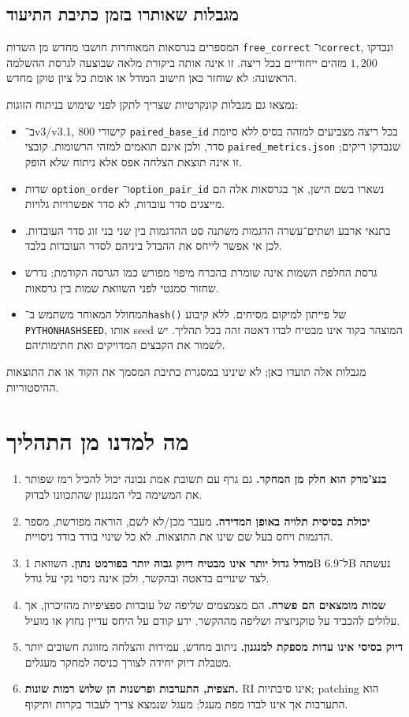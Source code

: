 \documentclass[11pt,a4paper]{article}
\newcommand{\en}[1]{\textenglish{#1}}
\newcommand{\file}[1]{\textenglish{\nolinkurl{#1}}}
\begin{document}
\subsection{מגבלות שאותרו בזמן כתיבת התיעוד}
המספרים בגרסאות המאוחרות חושבו מחדש מן השדות \file{free_correct} ו־\file{correct}, ונבדקו $1{,}200$ מזהים ייחודיים בכל ריצה. זו אינה אותה ביקורת מלאה שבוצעה לגרסת ההשלמה הראשונה: לא שוחזר כאן חישוב המודל או אומת כל ציון טוקן מחדש.

נמצאו גם מגבלות קונקרטיות שצריך לתקן לפני שימוש בניתוח הזוגות:
\begin{itemize}
\item ב־\en{v3/v3.1}, $800$ קישורי \file{paired_base_id} בכל ריצה מצביעים למזהה בסיס ללא סיומת סדר, ולכן אינם תואמים למזהי הרשומות. קובצי \file{paired_metrics.json} שנבדקו ריקים; זו אינה תוצאת הצלחה אפס אלא ניתוח שלא הופק.
\item שדות \file{option_order} ו־\file{option_pair_id} נשארו בשם הישן, אך בגרסאות אלה הם מייצגים סדר עובדות, לא סדר אפשרויות גלויות.
\item בתנאי ארבע ושתים־עשרה הדגמות משתנה סט ההדגמות בין שני בני זוג סדר העובדות. לכן אי אפשר לייחס את ההבדל ביניהם לסדר העובדות בלבד.
\item גרסת החלפת השמות אינה שומרת בהכרח מיפוי מפורש כמו הגרסה הקודמת; נדרש שחזור סמנטי לפני השוואת שמות בין גרסאות.
\item המחולל המאוחר משתמש ב־\file{hash()} של פייתון למיקום מסיחים. ללא קיבוע \file{PYTHONHASHSEED}, אותו \en{seed} המוצהר בקוד אינו מבטיח לבדו דאטה זהה בכל תהליך. יש לשמור את הקבצים המדויקים ואת חתימותיהם.
\end{itemize}
מגבלות אלה תועדו כאן; לא שינינו במסגרת כתיבת המסמך את הקוד או את התוצאות ההיסטוריות.

\section{מה למדנו מן התהליך}
\begin{enumerate}
\item \textbf{בנצ'מרק הוא חלק מן המחקר.} גם גרף עם תשובת אמת נכונה יכול להכיל רמז שפותר את המשימה בלי המנגנון שהתכוונו לבדוק.
\item \textbf{יכולת בסיסית תלויה באופן המדידה.} מעבר מכן/לא לשם, הוראה מפורשת, מספר הדגמות ויחס בעל שם שינו את התוצאות. לא כל שינוי בודד בודד ניסויית.
\item \textbf{מודל גדול יותר אינו מבטיח דיוק גבוה יותר בפורמט נתון.} השוואת \en{1B} ל־\en{6.9B} נעשתה לצד שינויים בדאטה ובהקשר, ולכן אינה ניסוי נקי על גודל.
\item \textbf{שמות מומצאים הם פשרה.} הם מצמצמים שליפה של עובדות ספציפיות מהזיכרון, אך עלולים להכביד על טוקניזציה ושליפה מההקשר. ידע קודם על היחס עדיין נחוץ או מועיל.
\item \textbf{דיוק בסיסי אינו עדות מספקת למנגנון.} ניתוב מחדש, עמידות והצלחה מזווגת חשובים יותר מטבלת דיוק יחידה לצורך כניסה למחקר מעגלים.
\item \textbf{תצפית, התערבות ופרשנות הן שלוש רמות שונות.} \en{RI} אינו סיבתיות; \en{patching} הוא התערבות אך אינו לבדו מפת מעגל; מעגל שנמצא צריך לעבור בקרות ותיקוף.
\end{enumerate}
\end{document}
